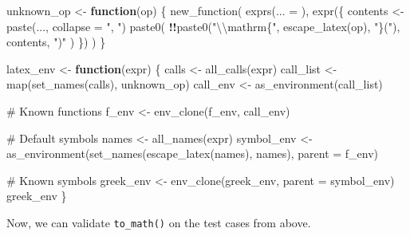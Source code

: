 \documentclass[
]{krantz}
\makeatletter
\newenvironment{Shaded}{\begin{snugshade}}{\end{snugshade}}
\newcommand{\CharTok}[1]{\textcolor[rgb]{0.31,0.60,0.02}{#1}}
\newcommand{\CommentTok}[1]{\textcolor[rgb]{0.56,0.35,0.01}{\textit{#1}}}
\newcommand{\ControlFlowTok}[1]{\textcolor[rgb]{0.13,0.29,0.53}{\textbf{#1}}}
\newcommand{\DataTypeTok}[1]{\textcolor[rgb]{0.13,0.29,0.53}{#1}}
\newcommand{\KeywordTok}[1]{\textcolor[rgb]{0.13,0.29,0.53}{\textbf{#1}}}
\newcommand{\NormalTok}[1]{#1}
\newcommand{\OperatorTok}[1]{\textcolor[rgb]{0.81,0.36,0.00}{\textbf{#1}}}
\newcommand{\StringTok}[1]{\textcolor[rgb]{0.31,0.60,0.02}{#1}}
\newenvironment{kframe}{%
\medskip{}
\setlength{\fboxsep}{.8em}
 \def\at@end@of@kframe{}%
 \ifinner\ifhmode%
  \def\at@end@of@kframe{\end{minipage}}%
  \begin{minipage}{\columnwidth}%
 \fi\fi%
 \def\FrameCommand##1{\hskip\@totalleftmargin \hskip-\fboxsep
 \colorbox{shadecolor}{##1}\hskip-\fboxsep
     \hskip-\linewidth \hskip-\@totalleftmargin \hskip\columnwidth}%
 \MakeFramed {\advance\hsize-\width
   \@totalleftmargin\z@ \linewidth\hsize
   \@setminipage}}%
 {\par\unskip\endMakeFramed%
 \at@end@of@kframe}
\renewenvironment{Shaded}{\begin{kframe}}{\end{kframe}}
\renewcommand{\KeywordTok} [1]{\textcolor[rgb]{0.00,0.44,0.13}{{#1}}}
\renewcommand{\DataTypeTok}[1]{\textcolor[rgb]{0.56,0.13,0.00}{{#1}}}
\renewcommand{\CharTok}    [1]{\textcolor[rgb]{0.25,0.44,0.63}{{#1}}}
\renewcommand{\StringTok}  [1]{\textcolor[rgb]{0.25,0.44,0.63}{{#1}}}
\renewcommand{\CommentTok} [1]{\textcolor[rgb]{0.38,0.63,0.69}{{#1}}}
\renewcommand{\NormalTok}  [1]{{#1}}
\makeatother
\begin{document}
\begin{Shaded}
\begin{Highlighting}[]
\NormalTok{unknown_op <-}\StringTok{ }\ControlFlowTok{function}\NormalTok{(op) \{}
  \KeywordTok{new_function}\NormalTok{(}
    \KeywordTok{exprs}\NormalTok{(}\DataTypeTok{... =}\NormalTok{ ),}
    \KeywordTok{expr}\NormalTok{(\{}
\NormalTok{      contents <-}\StringTok{ }\KeywordTok{paste}\NormalTok{(..., }\DataTypeTok{collapse =} \StringTok{", "}\NormalTok{)}
      \KeywordTok{paste0}\NormalTok{(}
        \OperatorTok{!!}\KeywordTok{paste0}\NormalTok{(}\StringTok{"}\CharTok{\textbackslash{}\textbackslash{}}\StringTok{mathrm\{"}\NormalTok{, }\KeywordTok{escape_latex}\NormalTok{(op), }\StringTok{"\}("}\NormalTok{), contents, }\StringTok{")"}
\NormalTok{      )}
\NormalTok{    \})}
\NormalTok{  )}
\NormalTok{\}}

\NormalTok{latex_env <-}\StringTok{ }\ControlFlowTok{function}\NormalTok{(expr) \{}
\NormalTok{  calls <-}\StringTok{ }\KeywordTok{all_calls}\NormalTok{(expr)}
\NormalTok{  call_list <-}\StringTok{ }\KeywordTok{map}\NormalTok{(}\KeywordTok{set_names}\NormalTok{(calls), unknown_op)}
\NormalTok{  call_env <-}\StringTok{ }\KeywordTok{as_environment}\NormalTok{(call_list)}
  
  \CommentTok{# Known functions}
\NormalTok{  f_env <-}\StringTok{ }\KeywordTok{env_clone}\NormalTok{(f_env, call_env)}
  
  \CommentTok{# Default symbols}
\NormalTok{  names <-}\StringTok{ }\KeywordTok{all_names}\NormalTok{(expr)}
\NormalTok{  symbol_env <-}\StringTok{ }\KeywordTok{as_environment}\NormalTok{(}\KeywordTok{set_names}\NormalTok{(}\KeywordTok{escape_latex}\NormalTok{(names), names),}
                               \DataTypeTok{parent =}\NormalTok{ f_env)}
  
  \CommentTok{# Known symbols}
\NormalTok{  greek_env <-}\StringTok{ }\KeywordTok{env_clone}\NormalTok{(greek_env, }\DataTypeTok{parent =}\NormalTok{ symbol_env)}
\NormalTok{  greek_env}
\NormalTok{\}}
\end{Highlighting}
\end{Shaded}

Now, we can validate \texttt{to\_math()} on the test cases from above.

\begin{Shaded}
\end{Shaded}
\end{document}
